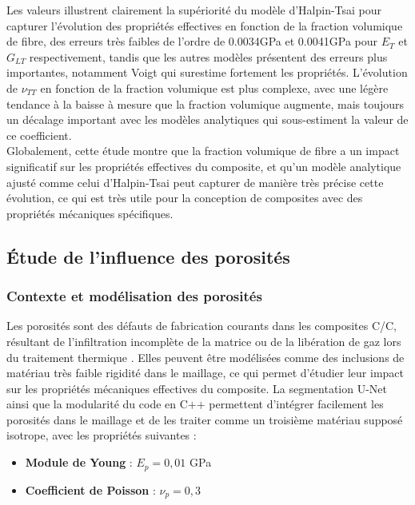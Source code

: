 \documentclass[a4paper,11pt]{article}
\begin{document}
Les valeurs illustrent clairement la supériorité du modèle d'Halpin-Tsai pour capturer l'évolution des propriétés effectives en fonction de la fraction volumique de fibre, des erreurs très faibles de l'ordre de 0.0034GPa et 0.0041GPa pour $E_T$ et $G_{LT}$ respectivement, tandis que les autres modèles présentent des erreurs plus importantes, notamment Voigt qui surestime fortement les propriétés. L'évolution de $\nu_{TT}$ en fonction de la fraction volumique est plus complexe, avec une légère tendance à la baisse à mesure que la fraction volumique augmente, mais toujours un décalage important avec les modèles analytiques qui sous-estiment la valeur de ce coefficient. \\

Globalement, cette étude montre que la fraction volumique de fibre a un impact significatif sur les propriétés effectives du composite, et qu'un modèle analytique ajusté comme celui d'Halpin-Tsai peut capturer de manière très précise cette évolution, ce qui est très utile pour la conception de composites avec des propriétés mécaniques spécifiques.

\subsection{Étude de l'influence des porosités}

\subsubsection{Contexte et modélisation des porosités}
Les porosités sont des défauts de fabrication courants dans les composites C/C, résultant de l'infiltration incomplète de la matrice ou de la libération de gaz lors du traitement thermique \cite{CharronCC}. Elles peuvent être modélisées comme des inclusions de matériau très faible rigidité  dans le maillage, ce qui permet d'étudier leur impact sur les propriétés mécaniques effectives du composite. La segmentation U-Net ainsi que la modularité du code en C$\texttt{++}$ permettent d'intégrer facilement les porosités dans le maillage et de les traiter comme un troisième matériau supposé isotrope, avec les propriétés suivantes :
\begin{itemize}
    \item \textbf{Module de Young} : $E_p = 0{,}01$ GPa
    \item \textbf{Coefficient de Poisson} : $\nu_p = 0{,}3$
\end{itemize}
\end{document}
